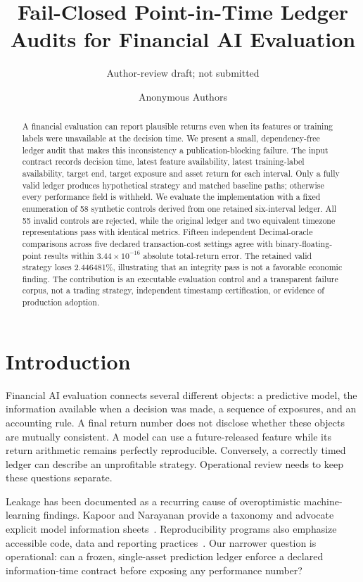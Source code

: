 \documentclass[sigconf,anonymous,nonacm]{acmart}
\title{Fail-Closed Point-in-Time Ledger Audits for Financial AI Evaluation}
\subtitle{Author-review draft; not submitted}
\author{Anonymous Authors}
\begin{document}
\begin{abstract}
A financial evaluation can report plausible returns even when its features or training labels were unavailable at the decision time. We present a small, dependency-free ledger audit that makes this inconsistency a publication-blocking failure. The input contract records decision time, latest feature availability, latest training-label availability, target end, target exposure and asset return for each interval. Only a fully valid ledger produces hypothetical strategy and matched baseline paths; otherwise every performance field is withheld. We evaluate the implementation with a fixed enumeration of 58 synthetic controls derived from one retained six-interval ledger. All 55 invalid controls are rejected, while the original ledger and two equivalent timezone representations pass with identical metrics. Fifteen independent Decimal-oracle comparisons across five declared transaction-cost settings agree with binary-floating-point results within $3.44\times10^{-16}$ absolute total-return error. The retained valid strategy loses 2.446481\%, illustrating that an integrity pass is not a favorable economic finding. The contribution is an executable evaluation control and a transparent failure corpus, not a trading strategy, independent timestamp certification, or evidence of production adoption.
\end{abstract}
\maketitle

\section{Introduction}
Financial AI evaluation connects several different objects: a predictive model, the information available when a decision was made, a sequence of exposures, and an accounting rule. A final return number does not disclose whether these objects are mutually consistent. A model can use a future-released feature while its return arithmetic remains perfectly reproducible. Conversely, a correctly timed ledger can describe an unprofitable strategy. Operational review needs to keep these questions separate.

Leakage has been documented as a recurring cause of overoptimistic machine-learning findings. Kapoor and Narayanan provide a taxonomy and advocate explicit model information sheets~\cite{kapoor2023}. Reproducibility programs also emphasize accessible code, data and reporting practices~\cite{pineau2021}. Our narrower question is operational: can a frozen, single-asset prediction ledger enforce a declared information-time contract before exposing any performance number?
\end{document}
